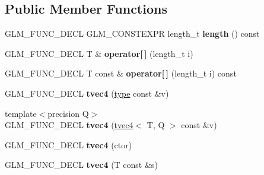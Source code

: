 \subsection*{Public Member Functions}
\begin{DoxyCompactItemize}
\item 
G\+L\+M\+\_\+\+F\+U\+N\+C\+\_\+\+D\+E\+CL G\+L\+M\+\_\+\+C\+O\+N\+S\+T\+E\+X\+PR length\+\_\+t {\bfseries length} () const \hypertarget{structglm_1_1detail_1_1tvec4_a1502180449724258f86218d0d9a84d60}{}\label{structglm_1_1detail_1_1tvec4_a1502180449724258f86218d0d9a84d60}

\item 
G\+L\+M\+\_\+\+F\+U\+N\+C\+\_\+\+D\+E\+CL T \& {\bfseries operator\mbox{[}$\,$\mbox{]}} (length\+\_\+t i)\hypertarget{structglm_1_1detail_1_1tvec4_ab3acad4916f2eb3d5e5c438f714eefce}{}\label{structglm_1_1detail_1_1tvec4_ab3acad4916f2eb3d5e5c438f714eefce}

\item 
G\+L\+M\+\_\+\+F\+U\+N\+C\+\_\+\+D\+E\+CL T const \& {\bfseries operator\mbox{[}$\,$\mbox{]}} (length\+\_\+t i) const \hypertarget{structglm_1_1detail_1_1tvec4_af44d36ca7826f0906e84d7ba1377759f}{}\label{structglm_1_1detail_1_1tvec4_af44d36ca7826f0906e84d7ba1377759f}

\item 
G\+L\+M\+\_\+\+F\+U\+N\+C\+\_\+\+D\+E\+CL {\bfseries tvec4} (\hyperlink{structglm_1_1detail_1_1tvec4}{type} const \&v)\hypertarget{structglm_1_1detail_1_1tvec4_afcfdeb0b6acbd1e65de7705a0080bed0}{}\label{structglm_1_1detail_1_1tvec4_afcfdeb0b6acbd1e65de7705a0080bed0}

\item 
{\footnotesize template$<$precision Q$>$ }\\G\+L\+M\+\_\+\+F\+U\+N\+C\+\_\+\+D\+E\+CL {\bfseries tvec4} (\hyperlink{structglm_1_1detail_1_1tvec4}{tvec4}$<$ T, Q $>$ const \&v)\hypertarget{structglm_1_1detail_1_1tvec4_a649d25bc38c98c9c95122a08d4eec842}{}\label{structglm_1_1detail_1_1tvec4_a649d25bc38c98c9c95122a08d4eec842}

\item 
G\+L\+M\+\_\+\+F\+U\+N\+C\+\_\+\+D\+E\+CL {\bfseries tvec4} (ctor)\hypertarget{structglm_1_1detail_1_1tvec4_a76288c36dfc019fc431f373a0deb120a}{}\label{structglm_1_1detail_1_1tvec4_a76288c36dfc019fc431f373a0deb120a}

\item 
G\+L\+M\+\_\+\+F\+U\+N\+C\+\_\+\+D\+E\+CL {\bfseries tvec4} (T const \&s)\hypertarget{structglm_1_1detail_1_1tvec4_af4c65b47ca8e04cb84fc7daf5f30d7ad}{}\label{structglm_1_1detail_1_1tvec4_af4c65b47ca8e04cb84fc7daf5f30d7ad}


\end{DoxyCompactItemize}
